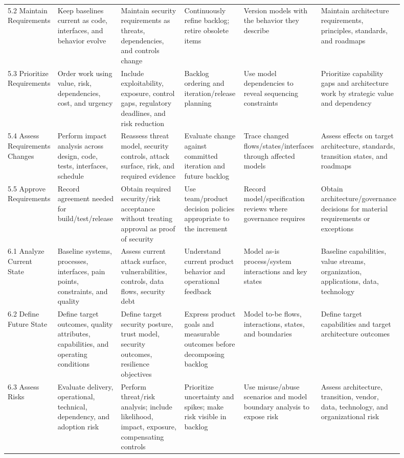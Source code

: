 \documentclass[11pt]{article}
\begin{document}
\begin{landscape}
\begin{longtable}{L{0.11\linewidth} L{0.16\linewidth} L{0.16\linewidth} L{0.15\linewidth} L{0.16\linewidth} L{0.16\linewidth}}
5.2 Maintain Requirements & Keep baselines current as code, interfaces, and behavior evolve & Maintain security requirements as threats, dependencies, and controls change & Continuously refine backlog; retire obsolete items & Version models with the behavior they describe & Maintain architecture requirements, principles, standards, and roadmaps\\
5.3 Prioritize Requirements & Order work using value, risk, dependencies, cost, and urgency & Include exploitability, exposure, control gaps, regulatory deadlines, and risk reduction & Backlog ordering and iteration/release planning & Use model dependencies to reveal sequencing constraints & Prioritize capability gaps and architecture work by strategic value and dependency\\
5.4 Assess Requirements Changes & Perform impact analysis across design, code, tests, interfaces, schedule & Reassess threat model, security controls, attack surface, risk, and required evidence & Evaluate change against committed iteration and future backlog & Trace changed flows/states/interfaces through affected models & Assess effects on target architecture, standards, transition states, and roadmaps\\
5.5 Approve Requirements & Record agreement needed for build/test/release & Obtain required security/risk acceptance without treating approval as proof of security & Use team/product decision policies appropriate to the increment & Record model/specification reviews where governance requires & Obtain architecture/governance decisions for material requirements or exceptions\\
6.1 Analyze Current State & Baseline systems, processes, interfaces, pain points, constraints, and quality & Assess current attack surface, vulnerabilities, controls, data flows, security debt & Understand current product behavior and operational feedback & Model as-is process/system interactions and key states & Baseline capabilities, value streams, organization, applications, data, technology\\
6.2 Define Future State & Define target outcomes, quality attributes, capabilities, and operating conditions & Define target security posture, trust model, security outcomes, resilience objectives & Express product goals and measurable outcomes before decomposing backlog & Model to-be flows, interactions, states, and boundaries & Define target capabilities and target architecture outcomes\\
6.3 Assess Risks & Evaluate delivery, operational, technical, dependency, and adoption risk & Perform threat/risk analysis; include likelihood, impact, exposure, compensating controls & Prioritize uncertainty and spikes; make risk visible in backlog & Use misuse/abuse scenarios and model boundary analysis to expose risk & Assess architecture, transition, vendor, data, technology, and organizational risk\\

\end{longtable}
\end{landscape}
\end{document}
